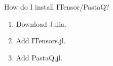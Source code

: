 \begin{frame}{How do I install ITensor/PastaQ?}

\begin{enumerate}[<+->]

  \item Download Julia.
  \item Add ITensors.jl.
  \item Add PastaQ.jl.

\end{enumerate}


\end{frame}
